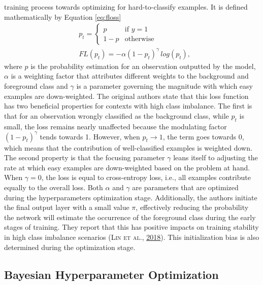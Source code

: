 \documentclass[a4paper,11pt]{article}
\begin{document}
training process towards optimizing for hard-to-classify examples. It is defined
mathematically by Equation \eqref{eq:floss}
\begin{equation}
\begin{aligned}
& p_t = 
\begin{cases} 
p & \text{if } y = 1 \\ 
1-p & \text{otherwise} 
\end{cases} \\
& FL(p_t) = -\alpha(1-p_t)^{\gamma} \, log(p_t) ,
\end{aligned}
\label{eq:floss}
\end{equation}
where \(p\) is the probability estimation for an observation outputted by the model,
\(\alpha\) is a weighting factor that attributes different weights to the background and
foreground class and \(\gamma\) is a parameter governing the magnitude with which
easy examples are down-weighted. The original authors state that this
loss function has two beneficial properties for contexts with high class imbalance.
The first is that for an observation wrongly classified as the background
class, while \(p_t\) is small, the loss remains nearly unaffected because the modulating
factor \((1-p_t)^{\gamma}\) tends towards 1. However, when \(p_t\rightarrow1\), the term
goes towards 0, which means that the contribution of well-classified examples is
weighted down. The second property is that the focusing parameter \(\gamma\)
leans itself to adjusting the rate at which easy examples are down-weighted based
on the problem at hand. When \(\gamma = 0\), the loss is equal to cross-entropy
loss, i.e., all examples contribute equally to the overall loss. Both \(\alpha\) and
\(\gamma\) are parameters that are optimized during the hyperparameters
optimization stage. Additionally, the authors initiate the final output layer with
a small value \(\pi\), effectively reducing the probability the network will estimate
the occurrence of the foreground class during the early stages of training. They report
that this has positive impacts on training stability in high class imbalance
scenarios \textsc{(\textnormal{\textsc{Lin} \textsc{et al.}}, \textnormal{\protect\hyperlink{ref-lin2018}{2018}})}. This initialization bias is also determined during the
optimization stage.

\hypertarget{bayesian-hyperparameter-optimization}{%
\subsection{Bayesian Hyperparameter Optimization}\label{bayesian-hyperparameter-optimization}}
\end{document}
